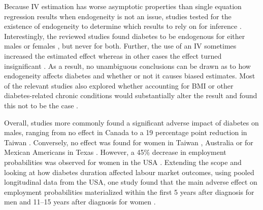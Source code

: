 Because \ac{IV} estimation has worse asymptotic properties than single equation regression results when endogeneity is not an issue, studies tested for the existence of endogeneity to determine which results to rely on for inference \parencite{Brown2005,Minor2011,Latif2009,Lin2011b}. Interestingly, the reviewed studies found diabetes to be endogenous for either males \parencite{Latif2009} or females \parencite{Brown2005,Minor2011}, but never for both. Further, the use of an \ac{IV} sometimes increased the estimated effect \parencite{Minor2011,Lin2011b} whereas in other cases the effect turned insignificant \parencite{Brown2005,Latif2009}. As a result, no unambiguous conclusions can be drawn as to how endogeneity affects diabetes and whether or not it causes biased estimates. Most of the relevant studies also explored whether accounting for \ac{BMI} or other diabetes-related chronic conditions would substantially alter the result and found this not to be the case \parencite{Brown2005,Latif2009,Minor2013}.

Overall, studies more commonly found a significant adverse impact of diabetes on males, ranging from no effect in Canada \parencite{Latif2009} to a 19 percentage point reduction in Taiwan \parencite{Lin2011b}. Conversely, no effect was found for women in Taiwan  \parencite{Lin2011b}, Australia  \parencite{Zhang2009} or for Mexican Americans in Texas \parencite{Brown2005}. However, a 45\% decrease in employment probabilities was observed for women in the USA \parencite{Minor2011}. Extending the scope and looking at how diabetes duration affected labour market outcomes, using pooled longitudinal data from the USA, one study found that the main adverse effect on employment probabilities materialized within the first 5 years after diagnosis for men and 11--15 years after diagnosis for women \parencite{Minor2013}.

